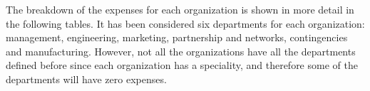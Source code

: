 The breakdown of the expenses for each organization is shown in more detail in the following tables. It has been considered six departments for each organization: management, engineering, marketing, partnership and networks, contingencies and manufacturing. However, not all the organizations have all the departments defined before since each organization has a speciality, and therefore some of the departments will have zero expenses.\\

\begin{table}[H]
\centering
\caption{Cost details in euros for HIRO.}
\label{my-label}
\end{table}
